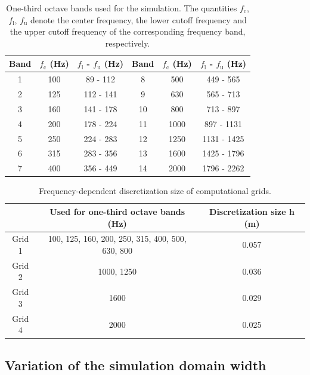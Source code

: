 \begin{table}
	\centering
	\caption{One-third octave bands used for the simulation. The quantities $f_{\text{c}}$, $f_{\text{l}}$, $f_{\text{u}}$ denote the center frequency, the lower cutoff frequency and the upper cutoff frequency of the corresponding frequency band, respectively.}
	\label{tab:third_octave_bands_used}
	\begin{tabular}{cccccc}
		\toprule
		Band & $f_{\text{c}}$ (Hz) & $f_{\text{l}}$ - $f_{\text{u}}$ (Hz) & Band & $f_{\text{c}}$ (Hz) & $f_{\text{l}}$ - $f_{\text{u}}$ (Hz) \\
		\midrule
		1 & 100 & 89 - 112 & 8 & 500 & 449 - 565 \\
		2 & 125 & 112 - 141 & 9 & 630 & 565 - 713 \\
		3 & 160 & 141 - 178 & 10 & 800 & 713 - 897 \\
		4 & 200 & 178 - 224 & 11 & 1000 & 897 - 1131 \\
		5 & 250 & 224 - 283 & 12 & 1250 & 1131 - 1425 \\
		6 & 315 & 283 - 356 & 13 & 1600 & 1425 - 1796 \\
		7 & 400 & 356 - 449 & 14 & 2000 & 1796 - 2262 \\
		\bottomrule
	\end{tabular}
\end{table}


\begin{table}
	\centering
	\caption{Frequency-dependent discretization size of computational grids.}
	\label{tab:grid_size}
	\begin{tabular}{ccc}
		\toprule
			& Used for one-third octave bands (Hz) & Discretization size h (m) \\
		\midrule
		Grid 1 & 100, 125, 160, 200, 250, 315, 400, 500, 630, 800 & 0.057 \\
		Grid 2 & 1000, 1250 & 0.036 \\
		Grid 3 & 1600 & 0.029 \\
		Grid 4 & 2000 & 0.025 \\
		\bottomrule
	\end{tabular}
\end{table}


\subsection*{Variation of the simulation domain width}

